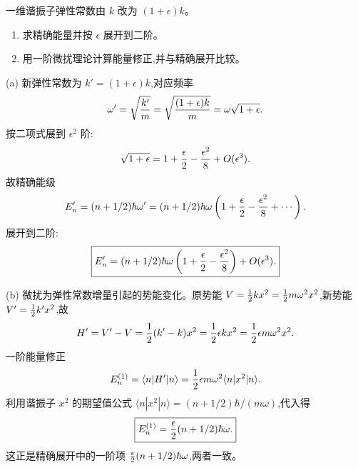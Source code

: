 \begin{question}
一维谐振子弹性常数由 $k$ 改为 $(1+\epsilon)k$。
\begin{enumerate}
\item 求精确能量并按 $\epsilon$ 展开到二阶。
\item 用一阶微扰理论计算能量修正,并与精确展开比较。
\end{enumerate}
\begin{solution}
(a) 新弹性常数为 $k'=(1+\epsilon)k$,对应频率
\[
\omega'=\sqrt{k'\over m}=\sqrt{(1+\epsilon)k\over m}
=\omega\sqrt{1+\epsilon}.
\]
按二项式展到 $\epsilon^2$ 阶:
\[
\sqrt{1+\epsilon}=1+{\epsilon\over2}-{\epsilon^2\over8}+O(\epsilon^3).
\]
故精确能级
\[
E_n'=(n+1/2)\hbar\omega'
=(n+1/2)\hbar\omega\left(1+{\epsilon\over2}-{\epsilon^2\over8}+\cdots\right).
\]
展开到二阶:
\[
\boxed{E_n'=(n+1/2)\hbar\omega\left(1+{\epsilon\over2}-{\epsilon^2\over8}\right)+O(\epsilon^3).}
\]

(b) 微扰为弹性常数增量引起的势能变化。原势能 $V={1\over2}kx^2={1\over2}m\omega^2x^2$,新势能 $V'={1\over2}k'x^2$,故
\[
H'=V'-V={1\over2}(k'-k)x^2={1\over2}\epsilon kx^2={1\over2}\epsilon m\omega^2x^2.
\]
一阶能量修正
\[
E_n^{(1)}=\langle n|H'|n\rangle={1\over2}\epsilon m\omega^2\langle n|x^2|n\rangle.
\]
利用谐振子 $x^2$ 的期望值公式 $\langle n|x^2|n\rangle=(n+1/2)\hbar/(m\omega)$,代入得
\[
\boxed{E_n^{(1)}={\epsilon\over2}(n+1/2)\hbar\omega.}
\]
这正是精确展开中的一阶项 ${\epsilon\over2}(n+1/2)\hbar\omega$,两者一致。
\end{solution}
\end{question}

